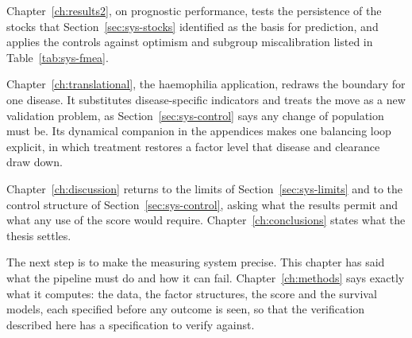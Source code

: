 Chapter~\ref{ch:results2}, on prognostic performance, tests the persistence
of the stocks that Section~\ref{sec:sys-stocks} identified as the basis for
prediction, and applies the controls against optimism and subgroup
miscalibration listed in Table~\ref{tab:sys-fmea}.

Chapter~\ref{ch:translational}, the haemophilia application, redraws the
boundary for one disease. It substitutes disease-specific indicators and
treats the move as a new validation problem, as Section~\ref{sec:sys-control}
says any change of population must be. Its dynamical companion in the
appendices makes one balancing loop explicit, in which treatment restores a
factor level that disease and clearance draw down.

Chapter~\ref{ch:discussion} returns to the limits of
Section~\ref{sec:sys-limits} and to the control structure of
Section~\ref{sec:sys-control}, asking what the results permit and what any
use of the score would require. Chapter~\ref{ch:conclusions} states what the
thesis settles.

The next step is to make the measuring system precise. This chapter has said
what the pipeline must do and how it can fail. Chapter~\ref{ch:methods} says
exactly what it computes: the data, the factor structures, the score and the
survival models, each specified before any outcome is seen, so that the
verification described here has a specification to verify against.
